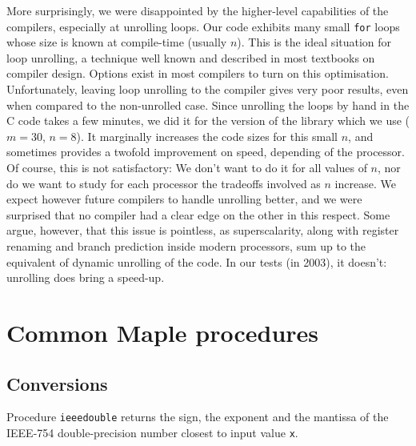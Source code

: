 More surprisingly, we were disappointed by the higher-level
capabilities of the compilers, especially at unrolling loops. Our code
exhibits many small \texttt{for} loops whose size is known at
compile-time (usually $n$). This is the ideal situation for loop
unrolling, a technique well known and described in most textbooks on
compiler design. Options exist in most compilers to turn on this
optimisation. Unfortunately, leaving loop unrolling to the compiler
gives very poor results, even when compared to the non-unrolled case.
Since unrolling the loops by hand in the C code takes a few minutes,
we did it for the version of the library which we use ($m=30$, $n=8$).
It marginally increases the code sizes for this small $n$, and
sometimes provides a twofold improvement on speed, depending of the
processor. Of course, this is not satisfactory: We don't want to do it
for all values of $n$, nor do we want to study for each processor the
tradeoffs involved as $n$ increase. We expect however future compilers
to handle unrolling better, and we were surprised that no compiler had
a clear edge on the other in this respect. Some argue, however, that
this issue is pointless, as superscalarity, along with register
renaming and branch prediction inside modern processors, sum up to the
equivalent of dynamic unrolling of the code. In our tests (in 2003), it
doesn't: unrolling does bring a speed-up.








\section{Common Maple procedures \label{section:commonMaple}}


\subsection{Conversions}





Procedure \texttt{ieeedouble} returns the sign, the exponent and the
mantissa of the IEEE-754 double-precision number closest to input
value \texttt{x}.

